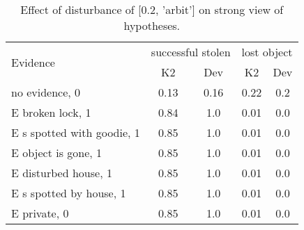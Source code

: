 \begin{table}\begin{tabular}{l|cc|cc}\toprule\multirow{2}{*}{Evidence} & \multicolumn{2}{c}{successful stolen}& \multicolumn{2}{c}{lost object}\\& {K2} & {Dev}& {K2} & {Dev}\\\midrule
no evidence, 0 & 0.13&0.16&0.22&0.2\\E broken lock, 1 & \cellcolor{Bittersweet}0.84&\cellcolor{Bittersweet}1.0&0.01&0.0\\E s spotted with goodie, 1 & \cellcolor{Bittersweet}0.85&\cellcolor{Bittersweet}1.0&0.01&0.0\\E object is gone, 1 & \cellcolor{Bittersweet}0.85&\cellcolor{Bittersweet}1.0&0.01&0.0\\E disturbed house, 1 & \cellcolor{Bittersweet}0.85&\cellcolor{Bittersweet}1.0&0.01&0.0\\E s spotted by house, 1 & \cellcolor{Bittersweet}0.85&\cellcolor{Bittersweet}1.0&0.01&0.0\\E private, 0 & \cellcolor{Bittersweet}0.85&\cellcolor{Bittersweet}1.0&0.01&0.0\\\bottomrule\end{tabular}\caption{Effect of disturbance of [0.2, 'arbit'] on strong view of hypotheses.}\end{table}